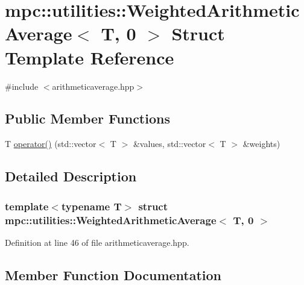 \hypertarget{structmpc_1_1utilities_1_1_weighted_arithmetic_average_3_01_t_00_010_01_4}{}\section{mpc\+:\+:utilities\+:\+:Weighted\+Arithmetic\+Average$<$ T, 0 $>$ Struct Template Reference}
\label{structmpc_1_1utilities_1_1_weighted_arithmetic_average_3_01_t_00_010_01_4}


{\ttfamily \#include $<$arithmeticaverage.\+hpp$>$}

\subsection*{Public Member Functions}
\begin{DoxyCompactItemize}
\item 
T \mbox{\hyperlink{structmpc_1_1utilities_1_1_weighted_arithmetic_average_3_01_t_00_010_01_4_ad93403c9fee56e45c8dbf2959d8f6ab3}{operator()}} (std\+::vector$<$ T $>$ \&values, std\+::vector$<$ T $>$ \&weights)
\end{DoxyCompactItemize}


\subsection{Detailed Description}
\subsubsection*{template$<$typename T$>$\newline
struct mpc\+::utilities\+::\+Weighted\+Arithmetic\+Average$<$ T, 0 $>$}



Definition at line 46 of file arithmeticaverage.\+hpp.



\subsection{Member Function Documentation}
\mbox{\label{structmpc_1_1utilities_1_1_weighted_arithmetic_average_3_01_t_00_010_01_4_ad93403c9fee56e45c8dbf2959d8f6ab3}} 
